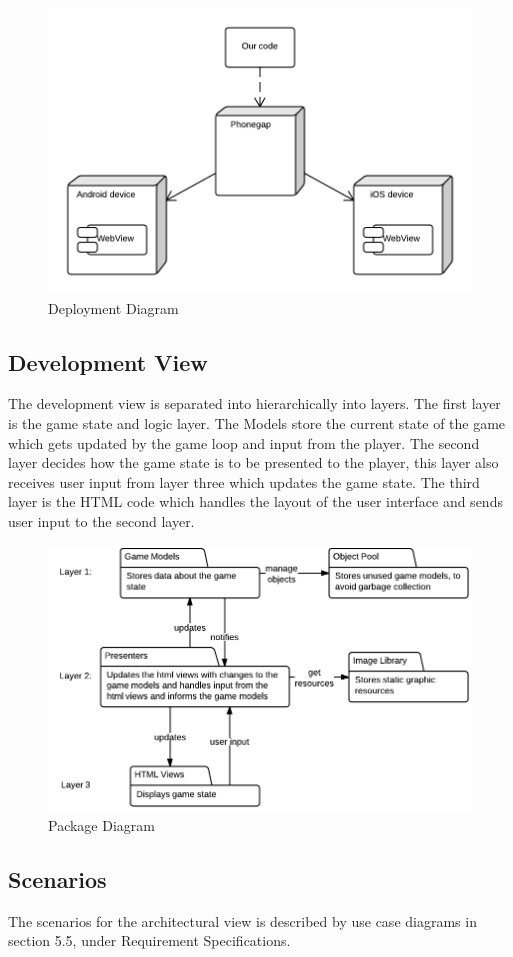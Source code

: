 	\begin{figure}[H]
		\centering
		\includegraphics[width=\textwidth]{pictures/deployment_diagram}
		\caption{Deployment Diagram}
	\end{figure}


\subsection*{Development View}

	The development view is separated into hierarchically into layers. The first layer is the game state 
	and logic layer. The Models store the current state of the game which gets updated by the game loop 
	and input from the player. The second layer decides how the game state is to be presented to the 
	player, this layer also receives user input from layer three which updates the game state. The third 
	layer is the HTML code which handles the layout of the user interface and sends user input to the
	second layer.

	\begin{figure}[H]
		\centering
		\includegraphics[scale=0.5]{pictures/development_view}
		\caption{Package Diagram}
	\end{figure}

\subsection*{Scenarios}
	
	The scenarios for the architectural view is described by use case diagrams in section 5.5, 
	under Requirement Specifications.


